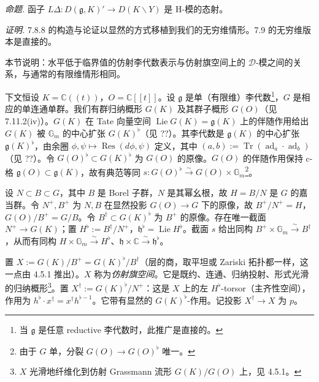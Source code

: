  \emph{命题.} 函子 $L\Delta:D(\mathfrak{g},K)'\to D(K\backslash Y)$ 是 H-模的态射。

\emph{证明.} 7.8.8 的构造与论证以显然的方式移植到我们的无穷维情形。7.9 的无穷维版本是直接的。


本节说明：水平低于临界值的仿射李代数表示与仿射旗空间上的 $\mathcal{D}$-模之间的关系，与通常的有限维情形相同。

 下文恒设 $K=\mathbb{C}((t))$，$O=\mathbb{C}[[t]]$。设 $\mathfrak{g}$ 是单（有限维）李代数\footnote{当 $\mathfrak{g}$ 是任意 reductive 李代数时，此推广是直接的。}，$G$ 是相应的单连通单群。我们有群归纳概形 $G(K)$ 及其群子概形 $G(O)$（见 7.11.2(iv)）。$G(K)$ 在 Tate 向量空间 $\operatorname{Lie}G(K)=\mathfrak{g}(K)$ 上的伴随作用给出 $G(K)$ 被 $\mathbb{G}_m$ 的中心扩张 $G(K)^{\flat}$（见 ??）。其李代数是 $\mathfrak{g}(K)$ 的中心扩张 $\mathfrak{g}(K)^{\flat}$，由余圈 $\phi,\psi\mapsto\operatorname{Res}(d\phi,\psi)$ 定义，其中 $(a,b):=\operatorname{Tr}(\operatorname{ad}_a\cdot\operatorname{ad}_b)$（见 ??）。令 $G(O)^{\flat}\subset G(K)^{\flat}$ 为 $G(O)$ 的原像。$G(O)$ 的伴随作用保持 c-格 $\mathfrak{g}(O)\subset\mathfrak{g}(K)$，故有典范等同 $s:G(O)^{\flat}\xrightarrow{\sim}G(O)\times\mathbb{G}_m$\footnote{由于 $G$ 单，分裂 $G(O)\to G(O)^{\flat}$ 唯一。}。%

设 $N\subset B\subset G$，其中 $B$ 是 Borel 子群，$N$ 是其幂幺根，故 $H=B/N$ 是 $G$ 的嘉当群。令 $N^{+},B^{+}$ 为 $N,B$ 在显然投影 $G(O)\to G$ 下的原像，故 $B^{+}/N^{+}=H$，$G(O)/B^{+}=G/B$。令 $B^{\dagger}\subset G(K)^{\flat}$ 为 $B^{+}$ 的原像。存在唯一截面 $N^{+}\to G(K)$；置 $H^{\flat}:=B^{\dagger}/N^{+}$，$\mathfrak{h}^{\flat}=\operatorname{Lie}H^{\flat}$。截面 $s$ 给出同构 $B^{+}\times\mathbb{G}_m\xrightarrow{\sim}B^{\dagger}$，从而有同构 $H\times\mathbb{G}_m\xrightarrow{\sim}H^{\flat}$、$\mathfrak{h}\times\mathbb{C}\xrightarrow{\sim}\mathfrak{h}^{\flat}$。

置 $X:=G(K)/B^{+}=G(K)^{\flat}/B^{\dagger}$（层的商，取平坦或 Zariski 拓扑都一样，这一点由 4.5.1 推出）。$X$ 称为\emph{仿射旗空间}。它是既约、连通、归纳投射、形式光滑的归纳概形\footnote{$X$ 光滑地纤维化到仿射 Grassmann 流形 $G(K)/G(O)$ 上，见 4.5.1。}。置 $X^{\dagger}:=G(K)^{\flat}/N^{+}$：这是 $X$ 上的左 $H^{\flat}$-torsor（主齐性空间），作用为 $h^{\flat}\cdot x^{\dagger}=x^{\dagger}h^{\flat-1}$。它带有显然的 $G(K)^{\flat}$-作用。记投影 $X^{\dagger}\to X$ 为 $p$。

